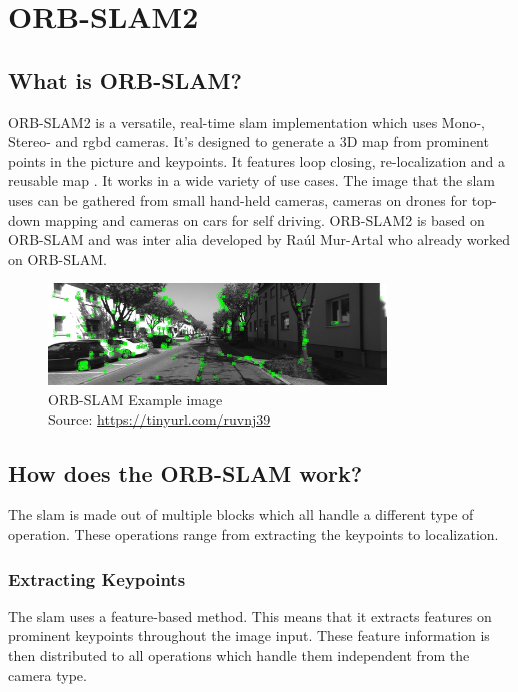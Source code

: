 
\chapter{ORB-SLAM2\authorA}\label{ref:orbslam}

\section{What is ORB-SLAM?}
ORB-SLAM2 is a versatile, real-time \gls{slam} implementation which uses Mono-, Stereo- and \gls{rgbd} cameras. It's designed to generate a 3D map from prominent points in the picture and keypoints. It features loop closing, re-localization and a reusable map \cite{orbslam2}. It works in a wide variety of use cases. The image that the \gls{slam} uses can be gathered from small hand-held cameras, cameras on drones for top-down mapping and cameras on cars for self driving.
ORB-SLAM2 is based on ORB-SLAM and was inter alia developed by Raúl Mur-Artal who already worked on ORB-SLAM.\newline
\begin{figure}[h]
	\centering
	\includegraphics[width=0.8\textwidth]{./media/images/orb-slam-kitti-dataset.png}
  	\caption{ORB-SLAM Example image
  	\\Source: \url{https://tinyurl.com/ruvnj39}}
  	\label{orbslamkittidataset}
\end{figure}

\section{How does the ORB-SLAM work?}

The \gls{slam} is made out of multiple blocks which all handle a different type of operation. These operations range from extracting the keypoints to localization.

\subsection{Extracting Keypoints}
The \gls{slam} uses a feature-based method. This means that it extracts features on prominent keypoints throughout the image input. These feature information is then distributed to all operations which handle them independent from the camera type. \cite{orbslam2} \newline\newline


